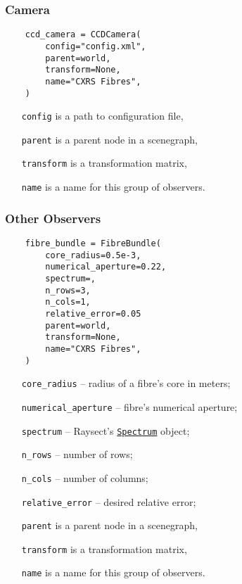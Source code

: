 \documentclass[../main.tex]{subfiles}
\begin{document}
\subsubsection{Camera}%
\label{sec:camera}

\begin{verbatim}
    ccd_camera = CCDCamera(
        config="config.xml",
        parent=world,
        transform=None,
        name="CXRS Fibres",
    )
\end{verbatim}

\begin{itemize}[align=left]
    \item[\texttt{config}] is a path to configuration file,
    \item[\texttt{parent}] is a parent node in a scenegraph,
    \item[\texttt{transform}] is a transformation matrix,
    \item[\texttt{name}] is a name for this group of observers.
\end{itemize}

\subsubsection{Other Observers}%
\label{sec:other_observers}

\begin{verbatim}
    fibre_bundle = FibreBundle(
        core_radius=0.5e-3,
        numerical_aperture=0.22,
        spectrum=,
        n_rows=3,
        n_cols=1,
        relative_error=0.05
        parent=world,
        transform=None,
        name="CXRS Fibres",
    )
\end{verbatim}

\begin{itemize}[align=left]
    \item[\texttt{core\_radius}] -- radius of a fibre's core in meters;
    \item[\texttt{numerical\_aperture}] -- fibre's numerical aperture;
    \item[\texttt{spectrum}] -- Raysect's \href{https://raysect.github.io/documentation/api_reference/optical/main_optical_classes.html?highlight=spectrum#raysect.optical.spectrum.Spectrum}{\texttt{Spectrum}} object;
    \item[\texttt{n\_rows}] -- number of rows;
    \item[\texttt{n\_cols}] -- number of columns;
    \item[\texttt{relative\_error}] -- desired relative error;
    \item[\texttt{parent}] is a parent node in a scenegraph,
    \item[\texttt{transform}] is a transformation matrix,
    \item[\texttt{name}] is a name for this group of observers.
\end{itemize}
\end{document}
